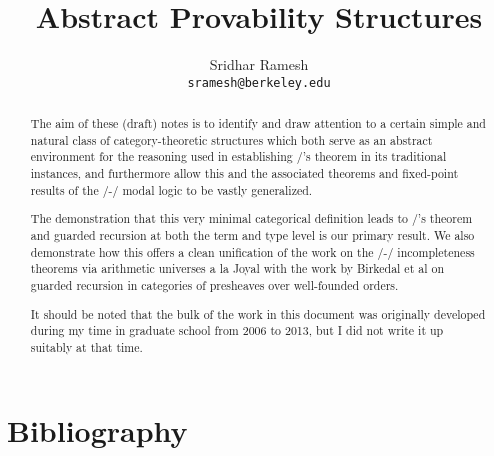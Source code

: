 \documentclass[12pt]{article}
\title{Abstract Provability Structures}
\author{
  Sridhar Ramesh\\
  \texttt{sramesh@berkeley.edu}
}
\begin{document}
\maketitle

\begin{abstract}
The aim of these (draft) notes is to identify and draw attention to a certain simple and natural class of category-theoretic structures which both serve as an abstract environment for the reasoning used in establishing \Loeb/'s theorem in its traditional instances, and furthermore allow this and the associated theorems and fixed-point results of the \Goedel/-\Loeb/ modal logic to be vastly generalized.

The demonstration that this very minimal categorical definition leads to \Loeb/'s theorem and guarded recursion at both the term and type level is our primary result. We also demonstrate how this offers a clean unification of the work on the \Godel/-\Lob/ incompleteness theorems via arithmetic universes a la Joyal with the work by Birkedal et al on guarded recursion in categories of presheaves over well-founded orders.

It should be noted that the bulk of the work in this document was originally developed during my time in graduate school from 2006 to 2013, but I did not write it up suitably at that time.
\end{abstract}

\newpage
{}
\setcounter{page}{1}
\tableofcontents












\newpage \section{Bibliography}
\printbibliography

\printindex
\end{document}

